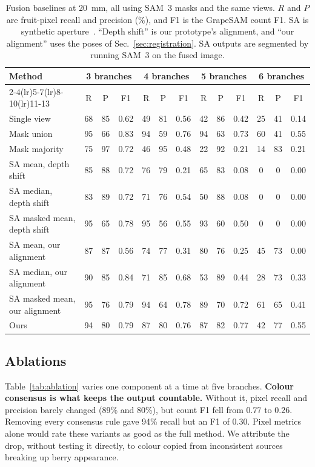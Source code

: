 \begin{table}[t]
\centering
\caption{Fusion baselines at 20~mm, all using SAM~3 masks and the same views. $R$ and $P$ are fruit-pixel recall and precision (\%), and F1 is the GrapeSAM count F1. SA is synthetic aperture~\cite{vaish2006}. ``Depth shift'' is our prototype's alignment, and ``our alignment'' uses the poses of Sec.~\ref{sec:registration}. SA outputs are segmented by running SAM~3 on the fused image.}
\label{tab:baselines}
\scriptsize
\begin{tabular}{@{}lcccccccccccc@{}}
\toprule
Method & \multicolumn{3}{c}{3 branches} & \multicolumn{3}{c}{4 branches} & \multicolumn{3}{c}{5 branches} & \multicolumn{3}{c}{6 branches}\\
\cmidrule(lr){2-4}\cmidrule(lr){5-7}\cmidrule(lr){8-10}\cmidrule(lr){11-13}
 & R & P & F1 & R & P & F1 & R & P & F1 & R & P & F1\\
\midrule
Single view & 68 & 85 & 0.62 & 49 & 81 & 0.56 & 42 & 86 & 0.42 & 25 & 41 & 0.14\\
\addlinespace[2pt]
Mask union & 95 & 66 & 0.83 & 94 & 59 & 0.76 & 94 & 63 & 0.73 & 60 & 41 & 0.55\\
Mask majority & 75 & 97 & 0.72 & 46 & 95 & 0.48 & 22 & 92 & 0.21 & 14 & 83 & 0.21\\
\addlinespace[2pt]
SA mean, depth shift & 85 & 88 & 0.72 & 76 & 79 & 0.21 & 65 & 83 & 0.08 & 0 & 0 & 0.00\\
SA median, depth shift & 83 & 89 & 0.72 & 71 & 76 & 0.54 & 50 & 88 & 0.08 & 0 & 0 & 0.00\\
SA masked mean, depth shift & 95 & 65 & 0.78 & 95 & 56 & 0.55 & 93 & 60 & 0.50 & 0 & 0 & 0.00\\
\addlinespace[2pt]
SA mean, our alignment & 87 & 87 & 0.56 & 74 & 77 & 0.31 & 80 & 76 & 0.25 & 45 & 73 & 0.00\\
SA median, our alignment & 90 & 85 & 0.84 & 71 & 85 & 0.68 & 53 & 89 & 0.44 & 28 & 73 & 0.33\\
SA masked mean, our alignment & 95 & 76 & 0.79 & 94 & 64 & 0.78 & 89 & 70 & 0.72 & 61 & 65 & 0.41\\
\addlinespace[2pt]
Ours & 94 & 80 & 0.79 & 87 & 80 & 0.76 & 87 & 82 & 0.77 & 42 & 77 & 0.55\\
\bottomrule
\end{tabular}
\end{table}

\subsection{Ablations}\label{sec:ablation}
Table~\ref{tab:ablation} varies one component at a time at five branches. \textbf{Colour consensus is what keeps the output countable.} Without it, pixel recall and precision barely changed (89\% and 80\%), but count F1 fell from 0.77 to 0.26. Removing every consensus rule gave 94\% recall but an F1 of 0.30. Pixel metrics alone would rate these variants as good as the full method. We attribute the drop, without testing it directly, to colour copied from inconsistent sources breaking up berry appearance.

